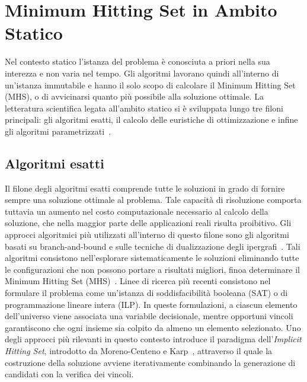 
\section{Minimum Hitting Set in Ambito Statico}\label{sec:minimum_hitting_set_in_ambito_statico}

Nel contesto statico l'istanza del problema è conosciuta a priori nella sua interezza e non varia nel tempo.
Gli algoritmi lavorano quindi all'interno di un'istanza immutabile e hanno il solo scopo di calcolare il Minimum Hitting Set (MHS), o di avvicinarsi quanto più possibile alla soluzione ottimale.
La letteratura scientifica legata all'ambito statico si è sviluppata lungo tre filoni principali: gli algoritmi esatti, il calcolo delle euristiche di ottimizzazione e infine gli algoritmi parametrizzati~\cite{moreno2013,johnson1974,downey2013}.

\subsection*{Algoritmi esatti}

Il filone degli algoritmi esatti comprende tutte le soluzioni in grado di fornire sempre una soluzione ottimale al problema.
Tale capacità di risoluzione comporta tuttavia un aumento nel costo computazionale necessario al calcolo della soluzione, che nella maggior parte delle applicazioni reali risulta proibitivo.
Gli approcci algoritmici più utilizzati all'interno di questo filone sono gli algoritmi basati su branch-and-bound e sulle tecniche di dualizzazione degli ipergrafi~\cite{murakami2011}.
Tali algoritmi consistono nell'esplorare sistematicamente le soluzioni eliminando tutte le configurazioni che non possono portare a risultati migliori, finoa determinare il Minimum Hitting Set (MHS)~\cite{blasius2022}.
Linee di ricerca più recenti consistono nel formulare il problema come un'istanza di soddisfacibilità booleana (SAT) o di programmazione lineare intera (ILP).
In queste formulazioni, a ciascun elemento dell'universo viene associata una variabile decisionale, mentre opportuni vincoli garantiscono che ogni insieme sia colpito da almeno un elemento selezionato.
Uno degli approcci più rilevanti in questo contesto introduce il paradigma dell'\textit{Implicit Hitting Set}, introdotto da Moreno-Centeno e Karp~\cite{moreno2013}, attraverso il quale la costruzione della soluzione avviene iterativamente combinando la generazione di candidati con la verifica dei vincoli.

